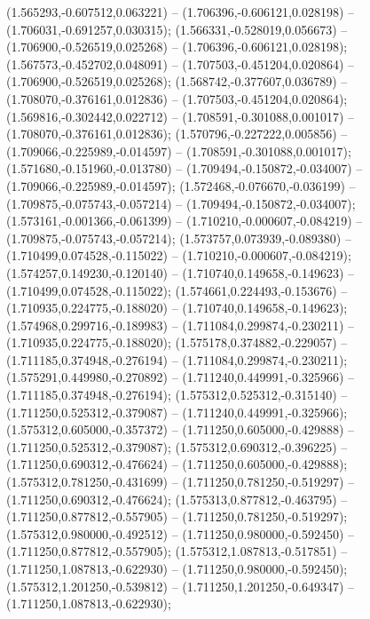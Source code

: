  (1.565293,-0.607512,0.063221) -- (1.706396,-0.606121,0.028198) -- (1.706031,-0.691257,0.030315);
 (1.566331,-0.528019,0.056673) -- (1.706900,-0.526519,0.025268) -- (1.706396,-0.606121,0.028198);
 (1.567573,-0.452702,0.048091) -- (1.707503,-0.451204,0.020864) -- (1.706900,-0.526519,0.025268);
 (1.568742,-0.377607,0.036789) -- (1.708070,-0.376161,0.012836) -- (1.707503,-0.451204,0.020864);
 (1.569816,-0.302442,0.022712) -- (1.708591,-0.301088,0.001017) -- (1.708070,-0.376161,0.012836);
 (1.570796,-0.227222,0.005856) -- (1.709066,-0.225989,-0.014597) -- (1.708591,-0.301088,0.001017);
 (1.571680,-0.151960,-0.013780) -- (1.709494,-0.150872,-0.034007) -- (1.709066,-0.225989,-0.014597);
 (1.572468,-0.076670,-0.036199) -- (1.709875,-0.075743,-0.057214) -- (1.709494,-0.150872,-0.034007);
 (1.573161,-0.001366,-0.061399) -- (1.710210,-0.000607,-0.084219) -- (1.709875,-0.075743,-0.057214);
 (1.573757,0.073939,-0.089380) -- (1.710499,0.074528,-0.115022) -- (1.710210,-0.000607,-0.084219);
 (1.574257,0.149230,-0.120140) -- (1.710740,0.149658,-0.149623) -- (1.710499,0.074528,-0.115022);
 (1.574661,0.224493,-0.153676) -- (1.710935,0.224775,-0.188020) -- (1.710740,0.149658,-0.149623);
 (1.574968,0.299716,-0.189983) -- (1.711084,0.299874,-0.230211) -- (1.710935,0.224775,-0.188020);
 (1.575178,0.374882,-0.229057) -- (1.711185,0.374948,-0.276194) -- (1.711084,0.299874,-0.230211);
 (1.575291,0.449980,-0.270892) -- (1.711240,0.449991,-0.325966) -- (1.711185,0.374948,-0.276194);
 (1.575312,0.525312,-0.315140) -- (1.711250,0.525312,-0.379087) -- (1.711240,0.449991,-0.325966);
 (1.575312,0.605000,-0.357372) -- (1.711250,0.605000,-0.429888) -- (1.711250,0.525312,-0.379087);
 (1.575312,0.690312,-0.396225) -- (1.711250,0.690312,-0.476624) -- (1.711250,0.605000,-0.429888);
 (1.575312,0.781250,-0.431699) -- (1.711250,0.781250,-0.519297) -- (1.711250,0.690312,-0.476624);
 (1.575313,0.877812,-0.463795) -- (1.711250,0.877812,-0.557905) -- (1.711250,0.781250,-0.519297);
 (1.575312,0.980000,-0.492512) -- (1.711250,0.980000,-0.592450) -- (1.711250,0.877812,-0.557905);
 (1.575312,1.087813,-0.517851) -- (1.711250,1.087813,-0.622930) -- (1.711250,0.980000,-0.592450);
 (1.575312,1.201250,-0.539812) -- (1.711250,1.201250,-0.649347) -- (1.711250,1.087813,-0.622930);
